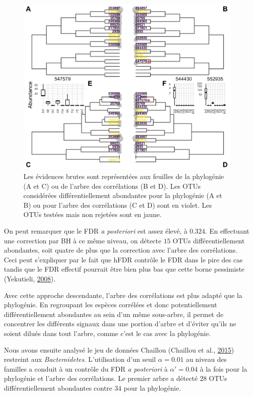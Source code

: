 \documentclass[12pt,a4paper]{reedthesis}
\theoremstyle{definition}
\theoremstyle{definition}
\theoremstyle{definition}
\theoremstyle{remark}
\begin{document}
\begin{figure}[!t]

{\centering \includegraphics[width=0.9\linewidth]{img/chlamydiae} 

}

\caption{Les évidences brutes sont représentées aux feuilles de la phylogénie (A et C) ou de l'arbre des corrélations (B et D). Les OTUs considérées différentiellement abondantes pour la phylogénie (A et B) ou pour l'arbre des corrélations (C et D) sont en violet. Les OTUs testées mais non rejetées sont en jaune.}\label{fig:chlamydiae}
\end{figure}
On peut remarquer que le FDR \emph{a posteriori} est assez élevé, à \(0.324\). En effectuant une correction par BH à ce même niveau, on détecte \(15\) OTUs différentiellement abondantes, soit quatre de plus que la correction avec l'arbre des corrélations. Ceci peut s'expliquer par le fait que hFDR contrôle le FDR dans le pire des cas tandis que le FDR effectif pourrait être bien plus bas que cette borne pessimiste (Yekutieli, \protect\hyperlink{ref-yekutieli2008hierarchical}{2008}).

Avec cette approche descendante, l'arbre des corrélations est plus adapté que la phylogénie. En regroupant les espèces corrélées et donc potentiellement différentiellement abondantes au sein d'un même sous-arbre, il permet de concentrer les différents signaux dans une portion d'arbre et d'éviter qu'ils ne soient dilués dans tout l'arbre, comme c'est le cas avec la phylogénie.

Nous avons ensuite analysé le jeu de données Chaillou (Chaillou et al., \protect\hyperlink{ref-chaillou2015origin}{2015}) restreint aux \emph{Bacteroidetes}. L'utilisation d'un seuil \(\alpha=0.01\) au niveau des familles a conduit à un contrôle du FDR \emph{a posteriori} à \(\alpha'=0.04\) à la fois pour la phylogénie et l'arbre des corrélations. Le premier arbre a détecté \(28\) OTUs différentiellement abondantes contre \(34\) pour la phylogénie.
\end{document}
